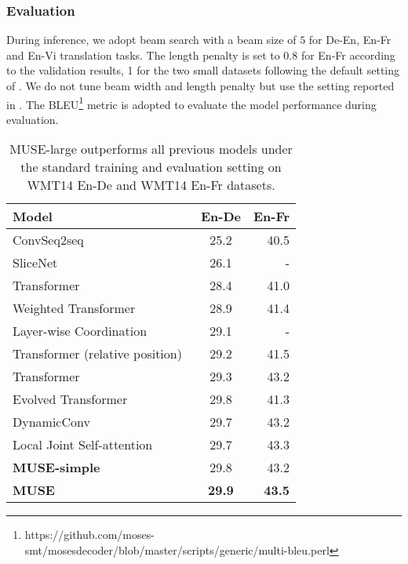 \documentclass{article} \usepackage{iclr2020_conference,times}
\begin{document}
\subsubsection{Evaluation}
During inference, we adopt beam search with a beam size of $5$ for De-En, En-Fr and  En-Vi translation tasks. The length penalty is set to 0.8 for En-Fr according to  the validation results, 1 for the two small datasets following the default setting of \cite{ott2019fairseq}. We do not tune beam width and length penalty but use the setting reported in \citet{vaswani2017attention}.
The BLEU\footnote{https://github.com/moses-smt/mosesdecoder/blob/master/scripts/generic/multi-bleu.perl} metric is adopted to evaluate the model performance during evaluation. 

\begin{table*}
\centering
\begin{tabular}{lcr}
\toprule
Model   & En-De & En-Fr \\
\midrule
ConvSeq2seq~\citep{gehring2017convolutional}  & 25.2  & 40.5 \\
SliceNet~\citep{kaiser2017depthwise} & 26.1 &- \\
Transformer~\citep{vaswani2017attention}  &28.4  & 41.0 \\
Weighted Transformer~\citep{ahmed2017weighted}  & 28.9 & 41.4 \\
Layer-wise Coordination~\citep{NIPS2018_8019}  & 29.1 & - \\
Transformer (relative position)~\citep{Shaw_2018}   & 29.2 & 41.5 \\
Transformer~\citep{ott2018scaling} & 29.3 & 43.2 \\
Evolved Transformer~\citep{so2019evolved} &  29.8 & 41.3 \\
DynamicConv~\citep{wu2019pay}  & 29.7 & 43.2 \\

Local Joint Self-attention~\citep{fonollosa2019joint} &29.7  & 43.3 \\
\midrule
\textbf{MUSE-simple} & 29.8 & 43.2 \\
\textbf{MUSE}  & \textbf{29.9} & \textbf{43.5} \\
\bottomrule
\end{tabular}
\caption{MUSE-large outperforms all previous models under the standard training and evaluation setting on WMT14 En-De and WMT14 En-Fr datasets.}
\label{tab:enfr}
\vspace{-0.2cm}
\end{table*}
\end{document}
